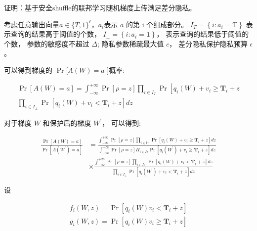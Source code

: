 证明：基于安全shuffle的联邦学习随机梯度上传满足差分隐私。

考虑任意输出向量$a \in\{T,1\}^{\ell}$，$a_{i}$表示 $a$ 的第 $\mathrm{i}$ 个组成部分。 $I_{T}=\left\{i: a_{i}=\mathrm{T}\right\}$ 表示查询的结果高于阈值的个数， $I_{\perp}=\left\{i: a_{i}=\mathbf{1}\right\}$， 表示查询的结果低于阈值的个数， 参数的敏感度不超过 $\Delta$; 隐私参数稀疏最大值 $c$， 差分隐私保护隐私预算 $\epsilon$。

可以得到梯度的 $\operatorname{Pr}[A(W)=a$ ]概率:

\begin{equation}
\begin{array}{l}
\operatorname{Pr}[A(W)=a]=\int_{-\infty}^{+\infty} \operatorname{Pr}[\rho=z] \prod_{i \in I_{T}} \operatorname{Pr}\left[q_{i}(W)+v_{i} \geq \boldsymbol{T}_{i}+z\right. \\
\prod_{i \in I_{\perp}} \operatorname{Pr}\left[q_{i}(W)+v_{i}<\boldsymbol{T}_{i}+z\right] d z
\end{array}
\end{equation}

对于梯度 $W$ 和保护后的梯度 $W^{\prime}$， 可以得到:

\begin{equation}
\begin{aligned}
\frac{\operatorname{Pr}[A(W)=a]}{\operatorname{Pr}\left[A\left(W^{\prime}\right)=a\right]} &=\frac{\int_{-\infty}^{+\infty} \operatorname{Pr}[\rho=z] \prod_{i \in l_{\top}} \operatorname{Pr}\left[q_{i}(W)+v_{i} \geq \boldsymbol{T}_{i}+z\right] d z}{\int_{-\infty}^{+\infty} \operatorname{Pr}[\rho=z] \Pi_{i \in I_{T}} \operatorname{Pr}\left[q_{i}\left(W^{\prime}\right)+v_{i} \geq \boldsymbol{T}_{i}+z\right] d z} \\
& \times \frac{\int_{-\infty}^{+\infty} \operatorname{Pr}[\rho=z] \prod_{i \in I_{\perp}} \operatorname{Pr}\left[q_{i}(W)+v_{i}<\boldsymbol{T}_{i}+z\right] d z}{\prod_{i \in I_{\perp}} \operatorname{Pr}\left[q_{i}\left(W^{\prime}\right)+v_{i}<\boldsymbol{T}_{i}+z\right] d z}
\end{aligned}
\end{equation}

设

\begin{equation}
\begin{array}{l}
f_{i}(W,z)=\operatorname{Pr}\left[q_{i}(W) v_{i}<\boldsymbol{T}_{i}+z\right] \\
g_{i}(W,z)=\operatorname{Pr}\left[q_{i}(W) v_{i} \geq \boldsymbol{T}_{i}+z\right]
\end{array}
\end{equation}

